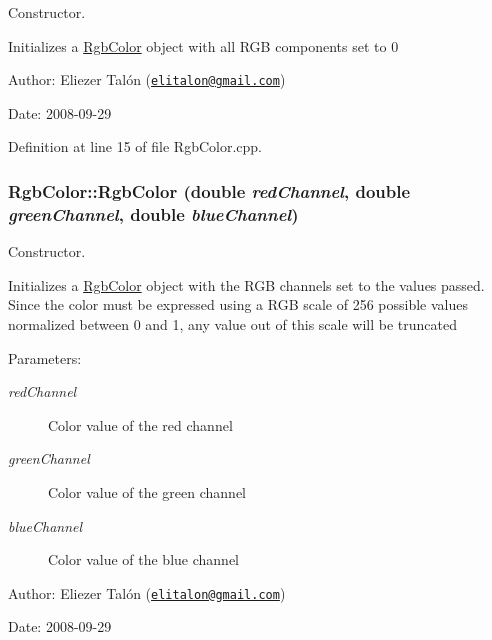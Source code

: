 Constructor. 

Initializes a \hyperlink{struct_rgb_color}{RgbColor} object with all RGB components set to 0

\begin{Desc}
\item[Author:]Eliezer Talón (\href{mailto:elitalon@gmail.com}{\tt elitalon@gmail.com}) \end{Desc}
\begin{Desc}
\item[Date:]2008-09-29 \end{Desc}


Definition at line 15 of file RgbColor.cpp.\hypertarget{struct_rgb_color_22ba5d2a596e39ca39b835b5571fd2c0}{
\subsubsection[RgbColor]{\setlength{\rightskip}{0pt plus 5cm}RgbColor::RgbColor (double {\em redChannel}, \/  double {\em greenChannel}, \/  double {\em blueChannel})}}
\label{struct_rgb_color_22ba5d2a596e39ca39b835b5571fd2c0}


Constructor. 

Initializes a \hyperlink{struct_rgb_color}{RgbColor} object with the RGB channels set to the values passed. Since the color must be expressed using a RGB scale of 256 possible values normalized between 0 and 1, any value out of this scale will be truncated

\begin{Desc}
\item[Parameters:]
\begin{description}
\item[{\em redChannel}]Color value of the red channel \item[{\em greenChannel}]Color value of the green channel \item[{\em blueChannel}]Color value of the blue channel\end{description}
\end{Desc}
\begin{Desc}
\item[Author:]Eliezer Talón (\href{mailto:elitalon@gmail.com}{\tt elitalon@gmail.com}) \end{Desc}
\begin{Desc}
\item[Date:]2008-09-29 \end{Desc}


